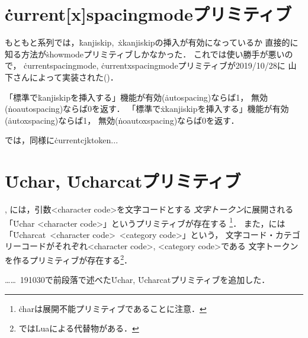 \documentclass[a4paper,11pt,nomag]{jsarticle}
\begin{document}
\section{\.{current[x]spacingmode}プリミティブ}
もともと\pTeX 系列では，\.{kanjiskip},~\.{xkanjiskip}の挿入が有効になっているか
直接的に知る方法が\.{showmode}プリミティブしかなかった．
これでは使い勝手が悪いので，
\.{currentspacingmode}, \.{currentxspacingmode}プリミティブが2019/10/28に
山下さんによって実装された(\cite{tjb94})．

\begin{cslist}
  \leavevmode\<「標準で\.{kanjiskip}を挿入する」機能が有効(\.{autospacing})ならば1，
  無効(\.{noautospacing})ならば0を返す．
  \leavevmode\<「標準で\.{xkanjiskip}を挿入する」機能が有効(\.{autoxspacing})ならば1，
  無効(\.{noautoxspacing})ならば0を返す．
\end{cslist}

\begin{dangerous}
  \eupTeX では，同様に\.{currentcjktoken}...
\end{dangerous}

\section{\.{Uchar}, \.{Ucharcat}プリミティブ}
, には，引数<character code>を文字コードとする
\emph{文字トークン}に展開される「\.{Uchar} <character code>」というプリミティブが存在する
\footnote{\.{char}は展開不能プリミティブであることに注意．}．
また，には「\.{Ucharcat}~<character code>~<category code>」という，
文字コード・カテゴリーコードがそれぞれ<character code>, <category code>である
文字トークンを作るプリミティブが存在する\footnote{ではLuaによる代替物がある．}．

……\epTeX~191030で前段落で述べた\.{Uchar}, \.{Ucharcat}プリミティブを追加した．
\end{document}
